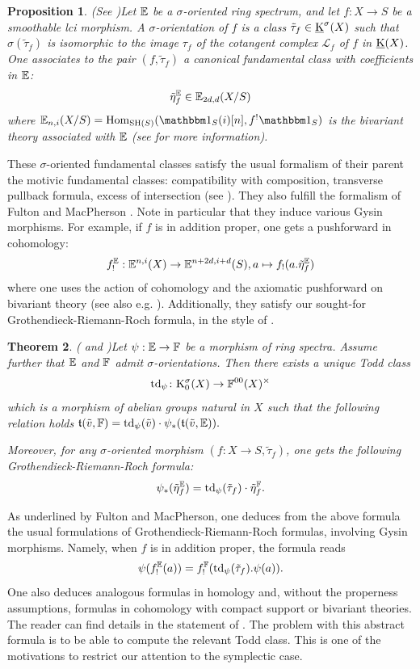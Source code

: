 \documentclass[11pt,leqno]{amsart}
\newtheorem{thmi}{Theorem}
\newtheorem{propi}[thmi]{Proposition}
\theoremstyle{remark}
\theoremstyle{definition}
\numberwithin{equation}{thm}
\begin{document}
\begin{propi}(See )\label{propi:fdl_classes}
Let $\mathbb E$ be a $\sigma$-oriented ring spectrum, and let $f:X \rightarrow S$ be a smoothable lci morphism. A \emph{$\sigma$-orientation} of $f$ is a class $\tilde \tau_f \in \operatorname{\underline K}^\sigma(X)$ such
 that $\sigma(\tilde \tau_f)$ is isomorphic to the image $\tau_f$ of the cotangent complex
 $\mathcal L_f$ of $f$ in $\operatorname{\underline K}(X)$. One associates to the pair $(f,\tilde \tau_f)$ a canonical fundamental class
 with coefficients  in $\mathbb E$:
$$
\tilde \eta_f^\mathbb E \in \mathbb E_{2d,d}(X/S)
$$
where $\E_{n,i}(X/S)=\Hom_{\SH(S)}(\un_S(i)[n],f^!\un_S)$
 is the bivariant theory associated with $\mathbb E$ (see  for more information).
\end{propi}
These $\sigma$-oriented fundamental classes satisfy the usual formalism of their parent
 the motivic fundamental classes: compatibility with composition,
 transverse pullback formula, excess of intersection (see \cite{DJK}).
 They also fulfill the formalism of Fulton and MacPherson \cite{FMP}.
 Note in particular that they induce various Gysin morphisms.
 For example, if $f$ is in addition proper, one gets a pushforward in cohomology:
$$
f^\mathbb E_!:\mathbb E^{n,i}(X) \rightarrow \mathbb E^{n+2d,i+d}(S), a \mapsto f_!(a.\tilde \eta_f^\mathbb E)
$$
where one uses the action of cohomology and the axiomatic pushforward on bivariant theory
 (see also e.g. \cite[Def. 3.3.2]{Deg16}).
Additionally, they satisfy our sought-for Grothendieck-Riemann-Roch formula,
 in the style of \cite[1.4]{FMP}.
\begin{thmi}( and )\label{thmi:GRR}
Let $\psi:\mathbb E \rightarrow \mathbb F$ be a morphism of ring spectra.
 Assume further that $\mathbb E$ and $\mathbb F$ admit $\sigma$-orientations. Then there exists a unique \emph{Todd class}
\[
\operatorname{td}_\psi\colon \mathrm{K}_0^{\sigma}(X) \rightarrow \mathbb F^{00}(X)^\times
\]
which is a morphism of abelian groups natural in $X$ such that
 the following relation holds
$
\mathfrak{t}(\tilde v,\mathbb F)=\operatorname{td}_\psi(\tilde v)\cdot\psi_*(\mathfrak{t}(\tilde v,\mathbb E)).
$

Moreover, for any $\sigma$-oriented morphism $(f:X \rightarrow S,\tilde \tau_f)$,
 one gets the following Grothendieck-Riemann-Roch formula:
$$
\psi_*(\tilde\eta_f^\mathbb E)=\operatorname{td}_\psi(\tilde \tau_f)\cdot\tilde\eta_f^\mathbb F.
$$
\end{thmi}
As underlined by Fulton and MacPherson, one deduces from the above formula
 the usual formulations of Grothendieck-Riemann-Roch formulas,
 involving Gysin morphisms. Namely, when $f$ is in addition proper, the formula reads
$$
\psi(f^\mathbb E_!(a))=f^\mathbb F_!(\operatorname{td}_\psi(\tilde \tau_f).\psi(a)).
$$
One also deduces analogous formulas in homology
 and, without the properness assumptions, formulas in cohomology
 with compact support or bivariant theories. The reader
 can find details in the statement of .
 The problem with this abstract formula is to be able to compute
 the relevant Todd class. This is one of the motivations to restrict our attention
 to the symplectic case.
 
\end{document}

